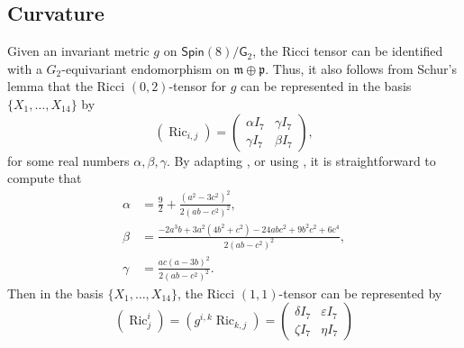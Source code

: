 \documentclass{amsart}
\let\epsilon\varepsilon
\numberwithin{equation}{section}
\theoremstyle{plain}
\theoremstyle{definition}
\theoremstyle{remark}
\numberwithin{table}{section}
\DeclareMathOperator{\Ric}{Ric}
\newcommand{\of}[1]{\left( #1 \right)}
\newcommand{\gG}{\mathsf{G}}
\newcommand{\Spin}{\mathsf{Spin}}
\newcommand{\fm}{\mathfrak{m}}
\newcommand{\fp}{\mathfrak{p}}
\begin{document}


\subsection{Curvature}
    Given an invariant metric $g$ on $\Spin(8)/\gG_2$, the Ricci tensor can be identified with a $G_2$-equivariant endomorphism on $\fm \oplus \fp$. 
    Thus, it also follows from Schur's lemma that the Ricci $(0,2)$-tensor for $g$ can be represented in the basis $\{X_1, \dots, X_{14}\}$ by
    \[
        \of{\Ric_{i,j}} = \begin{pmatrix}
            \alpha I_7 & \gamma I_7 \\
            \gamma I_7 & \beta I_7
        \end{pmatrix}, 
    \]
    for some real numbers $\alpha, \beta, \gamma$.
    By adapting \cite[Corollary 7.33]{Besse87}, or using \cite[Lemma 3.6]{Puttmann99}, it is straightforward to compute that 
        \begin{align*}
            \alpha &= \frac{9}{2} + \frac{(a^2 - 3 c^2)^2}{2(a b - c^2)^2},\\
            \beta &= \frac{-2 a^3 b + 3 a^2 (4 b^2 + c^2) - 24 a b c^2 + 9 b^2 c^2 + 6 c^4}{2(a b - c^2)^2}, \\
            \gamma &= \frac{a c (a - 3 b)^2}{2(a b - c^2)^2}.
        \end{align*}
        Then in the basis $\{X_1, \dots, X_{14}\}$, the Ricci $(1,1)$-tensor can be represented by
        \[
            \of{\Ric^i_j} = \of{g^{i,k} \Ric_{k,j}} = 
            \begin{pmatrix}
                \delta I_7 & \epsilon I_7 \\
                \zeta I_7 & \eta I_7
            \end{pmatrix}
        \]
\end{document}
